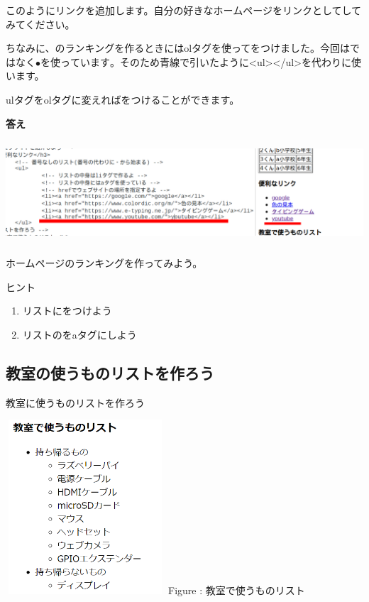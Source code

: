 \documentclass[a4paper,12pt]{jarticle}
\begin{document}
\flushleft
このようにリンクを追加します。自分の好きなホームページをリンクとしてしてみてください。

ちなみに、のランキングを作るときにはolタグを使ってをつけました。今回はではなく${\bullet}を使っています。そのため青線で引いたように${\textless}ul{\textgreater}{\textless}/ul{\textgreater}を代わりに使います。

ulタグをolタグに変えればをつけることができます。


\bigskip

\textbf{答え}

\centering
\includegraphics[width=14.617cm,height=3.821cm]{textbook-img202.png}

\flushleft
{}\theQuestion\label{Q:hasAnswer04-10}


ホームページのランキングを作ってみよう。

ヒント

\begin{enumerate}
  \item リストにをつけよう
  \item リストのをaタグにしよう
\end{enumerate}

\clearpage
{}
\subsection{\theExercise 教室の使うものリストを作ろう}
教室に使うものリストを作ろう

\bigskip
\centering
\begin{minipage}{5.937cm}
  {\upshape
    \includegraphics[width=5.937cm,height=6.498cm]{textbook-img203.png}
    \newline
    Figure : 教室で使うものリスト}
\end{minipage}
\end{document}

